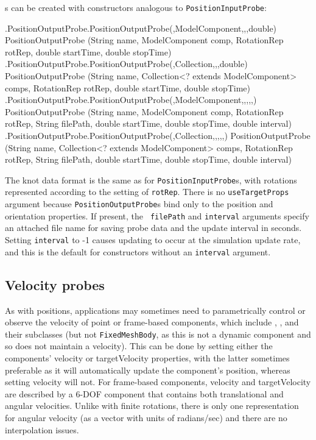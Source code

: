 s can be created
with constructors analogous to {\tt PositionInputProbe}:
%
\begin{methodtable}{0.9}{0.1}
\midline
%
\methodentry
{\probes.PositionOutputProbe.PositionOutputProbe(,ModelComponent,,,double)}%
{PositionOutputProbe (String name, ModelComponent comp, RotationRep rotRep,\brh
double startTime, double stopTime)}%
{\ }%
%
\methodspace{0.5em}%
\methodentry
{\probes.PositionOutputProbe.PositionOutputProbe(,Collection,,,double)}%
{PositionOutputProbe (String name, Collection<? extends ModelComponent> comps,\brh
RotationRep rotRep, 
double startTime, double stopTime)}%
{\ }%
%
\methodspace{0.5em}%
\methodentry
{\probes.PositionOutputProbe.PositionOutputProbe(,ModelComponent,,,,,)}%
{PositionOutputProbe (String name, ModelComponent comp, RotationRep rotRep,\brh
String filePath, double startTime, double stopTime, double interval)}%
{\ }%
%
\methodspace{0.5em}%
\methodentry
{\probes.PositionOutputProbe.PositionOutputProbe(,Collection,,,,,)}%
{PositionOutputProbe (String name, Collection<? extends ModelComponent> comps,\brh
RotationRep rotRep, String filePath, double startTime, double stopTime, 
double interval)}%
{\ }%
\midline
\end{methodtable}
%
The knot data format is the same as for {\tt PositionInputProbe}s, with
rotations represented according to the setting of {\tt rotRep}.  There is no
{\tt useTargetProps} argument because {\tt PositionOutputProbe}s bind only to
the {\sf position} and {\sf orientation} properties. If present, the {\tt
filePath} and {\tt interval} arguments specify an attached file name for saving
probe data and the update interval in seconds. Setting {\tt interval} to -1
causes updating to occur at the simulation update rate, and this is the default
for constructors without an {\tt interval} argument.


\subsection{Velocity probes}

As with positions, applications may sometimes need to parametrically control or
observe the velocity of point or frame-based components, which include
, ,
and their subclasses (but not {\tt FixedMeshBody}, as this is not a dynamic
component and so does not maintain a velocity).  This can be done by setting
either the components' {\sf velocity} or {\sf targetVelocity} properties, with
the latter sometimes preferable as it will automatically update the component's
position, whereas setting {\sf velocity} will not. For frame-based components,
{\sf velocity} and {\sf targetVelocity} are described by a
6-DOF  component that contains both
translational and angular velocities. Unlike with finite rotations, there is
only one representation for angular velocity (as a vector with units of
radians/sec) and there are no interpolation issues.

